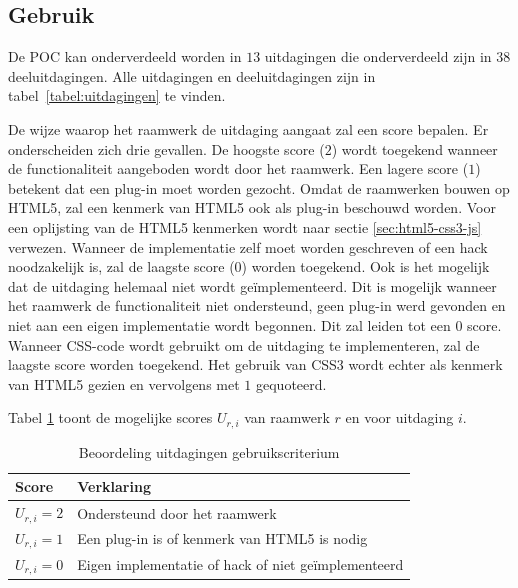 
\subsection{Gebruik}
\label{sec:vergelijking-gebruik}

De POC kan onderverdeeld worden in $13$ uitdagingen die onderverdeeld zijn in $38$ deeluitdagingen.
Alle uitdagingen en deeluitdagingen zijn in tabel~\ref{tabel:uitdagingen} te vinden.


De wijze waarop het raamwerk de uitdaging aangaat zal een score bepalen.
Er onderscheiden zich drie gevallen.
De hoogste score ($2$) wordt toegekend wanneer de functionaliteit aangeboden wordt door het raamwerk. 
Een lagere score ($1$) betekent dat een plug-in moet worden gezocht.
Omdat de raamwerken bouwen op HTML5, zal een kenmerk van HTML5 ook als plug-in beschouwd worden.
Voor een oplijsting van de HTML5 kenmerken wordt naar sectie \ref{sec:html5-css3-js} verwezen.
Wanneer de implementatie zelf moet worden geschreven of een hack noodzakelijk is, zal de laagste score ($0$) worden toegekend.
Ook is het mogelijk  dat de uitdaging helemaal niet wordt geïmplementeerd.
Dit is mogelijk wanneer het raamwerk de functionaliteit niet ondersteund,  geen plug-in werd gevonden en niet aan een eigen implementatie wordt begonnen.
Dit zal leiden tot een $0$ score.
Wanneer CSS-code wordt gebruikt om de uitdaging te implementeren, zal de laagste score worden toegekend.
Het gebruik van CSS3 wordt echter als kenmerk van HTML5 gezien en vervolgens met $1$ gequoteerd.

Tabel \ref{tabel:scores-uitdagingen} toont de mogelijke scores $U_{r,i}$ van raamwerk $r$ en voor uitdaging $i$.
\begin{table}[h]	
  \centering
  \begin{tabular}{ll}
    \toprule
    \textbf{Score} & \textbf{Verklaring}\\
    \midrule
    $U_{r,i} = 2$ & Ondersteund door het raamwerk\\
    $U_{r,i} = 1$ & Een plug-in is of kenmerk van HTML5 is nodig\\
    $U_{r,i} = 0$ & Eigen implementatie of hack of niet geïmplementeerd\\ 
    \bottomrule
  \end{tabular}
  \caption{Beoordeling uitdagingen gebruikscriterium}
  \label{tabel:scores-uitdagingen}
\end{table}

